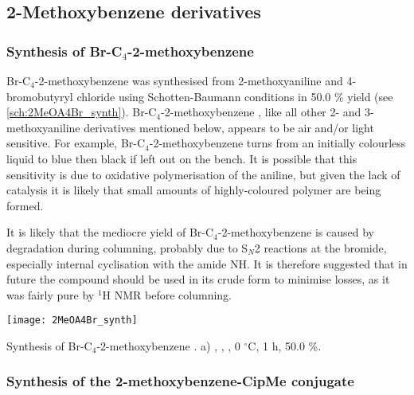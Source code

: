 
\subsection{2-Methoxybenzene derivatives\label{sec:2MeO}}

\subsubsection{Synthesis of Br-C$_4$-2-methoxybenzene }

Br-C$_4$-2-methoxybenzene  was synthesised from 2-methoxyaniline  and 4-bromobutyryl chloride  using Schotten-Baumann conditions in 50.0 \% yield (see \ref{sch:2MeOA4Br_synth}). Br-C$_4$-2-methoxybenzene , like all other 2- and 3-methoxyaniline derivatives mentioned below, appears to be air and/or light sensitive.  For example, Br-C$_4$-2-methoxybenzene  turns from an initially colourless liquid to blue then black if left out on the bench. It is possible that this sensitivity is due to oxidative polymerisation of the aniline\cite{Mezhuev2017,Ragimov1997}, but given the lack of catalysis it is likely that small amounts of highly-coloured polymer are being formed.

It is likely that the mediocre yield of Br-C$_4$-2-methoxybenzene  is caused by degradation during columning, probably due to S$_N$2 reactions at the bromide, especially internal cyclisation with the amide NH. It is therefore suggested that in future the compound should be used in its crude form to minimise losses, as it was fairly pure by $^{1}$H NMR before columning.

\begin{scheme}[H]
	\begin{center}
		\texttt{[image: 2MeOA4Br\_synth]}
		\caption{Synthesis of Br-C$_4$-2-methoxybenzene .
		a) , , , 0 $^{\circ}$C, 1 h, 50.0 \%.
		\label{sch:2MeOA4Br_synth}}
	\end{center}
\end{scheme}

\subsubsection{Synthesis of the 2-methoxybenzene-CipMe conjugate }

